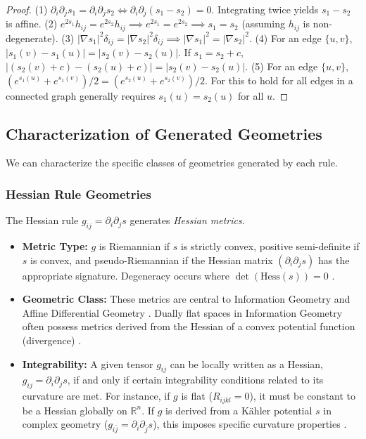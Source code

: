 \documentclass[twoside,twocolumn]{article}
\begin{document}
\begin{proof} %
(1) \( \partial_i \partial_j s_1 = \partial_i \partial_j s_2 \iff \partial_i \partial_j (s_1 - s_2) = 0 \). Integrating twice yields \( s_1-s_2 \) is affine.
(2) \( e^{2s_1} h_{ij} = e^{2s_2} h_{ij} \implies e^{2s_1}=e^{2s_2} \implies s_1=s_2 \) (assuming \( h_{ij} \) is non-degenerate).
(3) \( |\nabla s_1|^2 \delta_{ij} = |\nabla s_2|^2 \delta_{ij} \implies |\nabla s_1|^2 = |\nabla s_2|^2 \).
(4) For an edge \( \{u, v\} \), \( |s_1(v)-s_1(u)| = |s_2(v)-s_2(u)| \). If \( s_1 = s_2 + c \), \( |(s_2(v)+c)-(s_2(u)+c)| = |s_2(v)-s_2(u)| \).
(5) For an edge \( \{u, v\} \), \( (e^{s_1(u)}+e^{s_1(v)})/2 = (e^{s_2(u)}+e^{s_2(v)})/2 \). For this to hold for all edges in a connected graph generally requires \( s_1(u) = s_2(u) \) for all \( u \).
\end{proof}

\subsection{Characterization of Generated Geometries}

We can characterize the specific classes of geometries generated by each rule.

\subsubsection{Hessian Rule Geometries}
The Hessian rule \( g_{ij} = \partial_i \partial_j s \) generates \emph{Hessian metrics}.
\begin{itemize}
    \item \textbf{Metric Type:} \( g \) is Riemannian if \( s \) is strictly convex, positive semi-definite if \( s \) is convex, and pseudo-Riemannian if the Hessian matrix \( (\partial_i \partial_j s) \) has the appropriate signature. Degeneracy occurs where \( \det(\text{Hess}(s)) = 0 \) \cite{Rockafellar1970}. %
    \item \textbf{Geometric Class:} These metrics are central to Information Geometry and Affine Differential Geometry \cite{Amari2016,Shima2007}. %
    Dually flat spaces in Information Geometry often possess metrics derived from the Hessian of a convex potential function (divergence) \cite{Amari2016}. %
    \item \textbf{Integrability:} A given tensor \( g_{ij} \) can be locally written as a Hessian, \( g_{ij}=\partial_i\partial_j s \), if and only if certain integrability conditions related to its curvature are met. For instance, if \( g \) is flat (\( R_{ijkl}=0 \)), it must be constant to be a Hessian globally on \( \mathbb{R}^n \). If \( g \) is derived from a K\"ahler potential \( s \) in complex geometry (\( g_{i\bar{j}} = \partial_i \partial_{\bar{j}} s \)), this imposes specific curvature properties \cite{Jost2017}. %
\end{itemize}
\end{document}

